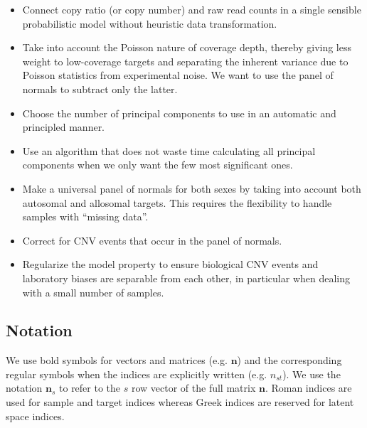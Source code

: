 \documentclass[nofootinbib,amssymb,amsmath]{revtex4}
\begin{document}
\begin{itemize}

\item Connect copy ratio (or copy number) and raw read counts in a single sensible probabilistic model without heuristic data transformation.

\item Take into account the Poisson nature of coverage depth, thereby giving less weight to low-coverage targets and separating the inherent variance due to Poisson statistics from experimental noise. We want to use the panel of normals to subtract only the latter.

\item Choose the number of principal components to use in an automatic and principled manner.

\item Use an algorithm that does not waste time calculating all principal components when we only want the few most significant ones.

\item Make a universal panel of normals for both sexes by taking into account both autosomal and allosomal targets. This requires the flexibility to handle samples with ``missing data''.

\item Correct for CNV events that occur in the panel of normals.

\item Regularize the model property to ensure biological CNV events and laboratory biases are separable from each other, in particular when dealing with a small number of samples.

\end{itemize}

\subsection{Notation}
We use bold symbols for vectors and matrices (e.g. $\mathbf{n}$) and the corresponding regular symbols when the indices are explicitly written (e.g. $n_{st}$). We use the notation $\mathbf{n}_s$ to refer to the $s$ row vector of the full matrix $\mathbf{n}$. Roman indices are used for sample and target indices whereas Greek indices are reserved for latent space indices.
\end{document}

